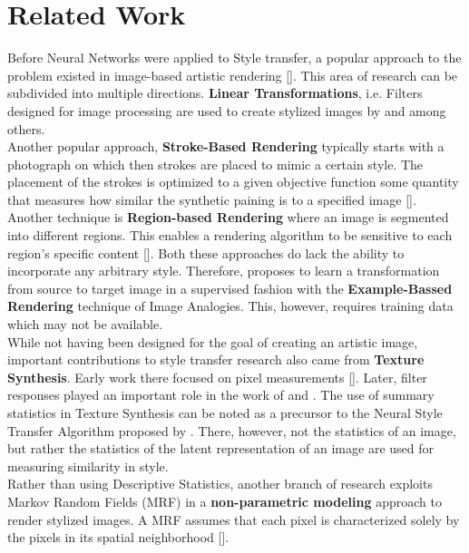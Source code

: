 \documentclass{seminar}
\begin{document}
\section{Related Work}
Before Neural Networks were applied to Style transfer, a popular approach to the problem existed in image-based artistic rendering [\cite{kyprianidis2012state}]. This area of research can be subdivided into multiple directions. \textbf{Linear Transformations}, i.e. Filters designed for image processing are used to create stylized images by \cite{winnemoller2006real} and \cite{tomasi1998bilateral} among others.\\ 
Another popular approach, \textbf{Stroke-Based Rendering} typically starts with a photograph on which then strokes are placed to mimic a certain style. The placement of the strokes is optimized to a given objective function some quantity that measures how similar the synthetic paining is to a specified image [\cite{hertzmann2003survey}]. Another technique is \textbf{Region-based Rendering} where an image is segmented into different regions. This enables a rendering algorithm to be sensitive to each region's specific content [\cite{kolliopoulos2005image}]. Both these approaches do lack the ability to incorporate any arbitrary style. Therefore, \cite{hertzmann2001image} proposes to learn a transformation from source to target image in a supervised fashion with the \textbf{Example-Bassed Rendering} technique of Image Analogies. This, however, requires training data which may not be available.\\
While not having been designed for the goal of creating an artistic image, important contributions to style transfer research also came from \textbf{Texture Synthesis}. 
Early work there focused on pixel measurements [\cite{julesz1962visual}].
Later, filter responses played an important role in the work of \cite{heeger1995pyramid} and \cite{portilla2000parametric}. The use of summary statistics in Texture Synthesis can be noted as a precursor to the Neural Style Transfer Algorithm proposed by \cite{gatys2015neural}. There, however, not the statistics of an image, but rather the statistics of the latent representation of an image are used for measuring similarity in style.\\
Rather than using Descriptive Statistics, another branch of research exploits Markov Random Fields (MRF) in a \textbf{non-parametric modeling} approach to render stylized images. A MRF assumes that each pixel is characterized solely by the pixels in its spatial neighborhood [\cite{jing2019neural}].
\end{document}
